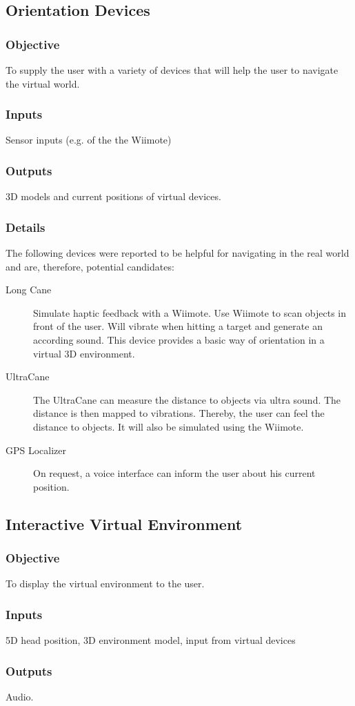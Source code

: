 \documentclass{assign}
\newcommand{\objectives}{\subsubsection{Objective}}
\newcommand{\inputs}{\subsubsection{Inputs}}
\newcommand{\outputs}{\subsubsection{Outputs}}
\newcommand{\details}{\subsubsection{Details}}
\begin{document}
\subsection{Orientation Devices}

\objectives To supply the user with a variety of devices that will help the user
to navigate the virtual world.

\inputs Sensor inputs (e.g. of the the Wiimote)

\outputs 3D models and current positions of virtual devices.

\details The following devices were reported to be helpful for
navigating in the real world\cite{secondlife} and are, therefore, potential
candidates:
\begin{description}
  \item[Long Cane] Simulate haptic feedback with a Wiimote. Use Wiimote to scan
  objects in front of the user. Will vibrate when hitting a target and generate
  an according sound. This device provides a basic way of orientation in a
  virtual 3D environment.
  \item[UltraCane] The UltraCane\cite{ultracane} can measure the distance to
  objects via ultra sound. The distance is then mapped to vibrations. Thereby,
  the user can feel the distance to objects. It will also be simulated using the
  Wiimote.
  \item[GPS Localizer] On request, a voice interface can inform the user about
  his current position.
\end{description}

\subsection{Interactive Virtual Environment}

\objectives To display the virtual environment to the user.

\inputs 5D head position, 3D environment model, input from virtual devices

\outputs Audio.



\end{document}
